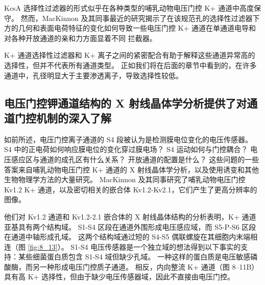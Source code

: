 KcsA 选择性过滤器的形式似乎在各种类型的哺乳动物电压门控 K+ 通道中高度保守。 
然而，MacKinnon 及其同事最近的研究揭示了在该规范孔的选择性过滤器下方的几何和表面电荷特征的变化如何导致一些电压门控 K+ 通道在单通道电导和对各种开放通道的亲和力方面显着不同 拦截器。


K+ 通道选择性过滤器和 K+ 离子之间的紧密配合有助于解释这些通道异常高的选择性，但并不代表所有通道类型。 
正如我们将在后面的章节中看到的，在许多通道中，孔径明显大于主要渗透离子，导致选择性较低。





\subsection{电压门控钾通道结构的 X 射线晶体学分析提供了对通道门控机制的深入了解}

如前所述，电压门控离子通道的 S4 段被认为是检测膜电位变化的电压传感器。 
S4 中的正电荷如何响应膜电位的变化穿过膜电场？ 
S4 运动如何与门控耦合？ 
电压感应区与通道的成孔区有什么关系？ 
开放通道的配置是什么？ 
这些问题的一些答案来自哺乳动物电压门控 K+ 通道的 X 射线晶体学分析，以及使用诱变和其他生物物理学方法的大量研究。 
MacKinnon 及其同事研究了哺乳动物电压门控 Kv1.2 K+ 通道，以及密切相关的嵌合体 Kv1.2-Kv2.1，它们产生了更高分辨率的图像。


他们对 Kv1.2 通道和 Kv1.2-2.1 嵌合体的 X 射线晶体结构的分析表明，K+ 通道亚基具有两个结构域。 
S1-S4 区段在通道外围形成电压感应域，而 S5-P-S6 区段在通道中轴形成孔域。 
这两个结构域通过短的 S4-S5 偶联螺旋在其细胞内末端相连（图 \ref{fig:8_13}）。 
S1-S4 电压传感器是一个独立域的想法得到以下事实的支持：某些细菌蛋白质包含 S1-S4 域但缺少孔域。 
一种这样的蛋白质是电压敏感磷酸酶，而另一种形成电压门控质子通道。 
相反，内向整流 K+ 通道（图 8–11B）具有高 K+ 选择性，但由于缺少电压传感器域，因此不直接由电压门控。

